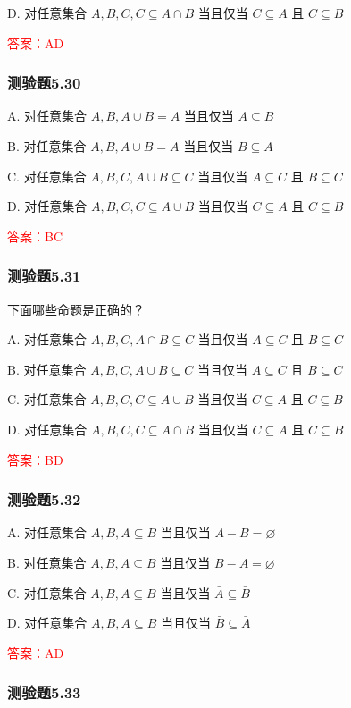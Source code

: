 \documentclass[UTF8, heading=true]{ctexart}
\begin{document}
D. 对任意集合 $A, B, C, C \subseteq A \cap B$ 当且仅当 $C \subseteq A$ 且 $C \subseteq B$

\textcolor{red}{答案：AD}

\subsubsection{测验题5.30}
A. 对任意集合 $A, B, A \cup B=A$ 当且仅当 $A \subseteq B$

B. 
对任意集合 $A, B, A \cup B=A$ 当且仅当 $B \subseteq A$

C. 
对任意集合 $A, B, C, A \cup B \subseteq C$ 当且仅当 $A \subseteq C$ 且 $B \subseteq C$

D. 
对任意集合 $A, B, C, C \subseteq A \cup B$ 当且仅当 $C \subseteq A$ 且 $C \subseteq B$

\textcolor{red}{答案：BC}

\subsubsection{测验题5.31}

下面哪些命题是正确的？

A. 对任意集合 $A, B, C, A \cap B \subseteq C$ 当且仅当 $A \subseteq C$ 且 $B \subseteq C$

B. 对任意集合 $A, B, C, A \cup B \subseteq C$ 当且仅当 $A \subseteq C$ 且 $B \subseteq C$

C. 对任意集合 $A, B, C, C \subseteq A \cup B$ 当且仅当 $C \subseteq A$ 且 $C \subseteq B$

D. 对任意集合 $A, B, C, C \subseteq A \cap B$ 当且仅当 $C \subseteq A$ 且 $C \subseteq B$

\textcolor{red}{答案：BD}

\subsubsection{测验题5.32}

A. 
对任意集合 $A, B, A \subseteq B$ 当且仅当 $A-B=\varnothing$

B. 
对任意集合 $A, B, A \subseteq B$ 当且仅当 $B-A=\varnothing$

C. 
对任意集合 $A, B, A \subseteq B$ 当且仅当 $\bar{A} \subseteq \bar{B}$

D. 
对任意集合 $A, B, A \subseteq B$ 当且仅当 $\bar{B} \subseteq \bar{A}$

\textcolor{red}{答案：AD}

\subsubsection{测验题5.33}
\end{document}
